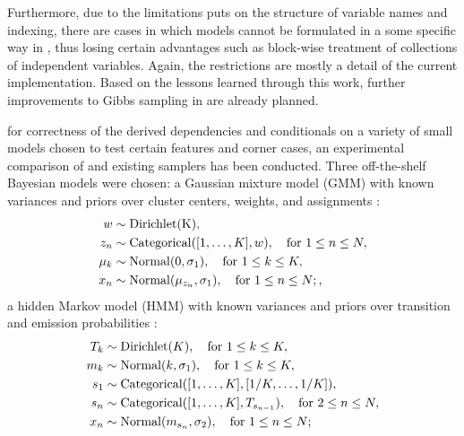 Furthermore, due to the limitations \autogibbsjl{} puts on the structure of variable names and
indexing, there are cases in which models cannot be formulated in a some specific way in \dppljl{},
thus losing certain advantages such as block-wise treatment of collections of independent variables.
Again, the restrictions are mostly a detail of the current implementation.  Based on the lessons
learned through this work, further improvements to Gibbs sampling in \turingjl{} are already
planned.

 for correctness of the derived dependencies and conditionals
on a variety of small models chosen to test certain features and corner cases, an experimental
comparison of \autogibbsjl{} and existing \turingjl{} samplers has been conducted.  Three
off-the-shelf Bayesian models were chosen: a Gaussian mixture model (GMM) with known variances and
priors over cluster centers, weights, and assignments \parencite[section 6.2]{marin2007bayesian}:
\begin{equation}
  \label{eq:gmm}
  \begin{aligned}
    w &\sim \mathrm{Dirichlet(K)}, \\
    z_{n} &\sim \mathrm{Categorical}([1, \ldots, K], w), \quad\text{for } 1 \le n \le N, \\
    \mu_{k} &\sim \mathrm{Normal}(0, \sigma_{1}), \quad\text{for } 1 \le k \le K, \\
    x_{n} &\sim \mathrm{Normal}(\mu_{z_{n}}, \sigma_{1}), \quad\text{for } 1 \le n \le N;,
  \end{aligned}
\end{equation}
a hidden Markov model
(HMM) with known variances and priors over transition and emission probabilities \parencite[section
7.3]{marin2007bayesian}:
\begin{equation}
  \label{eq:hmm}
  \begin{aligned}
    T_{k} &\sim \mathrm{Dirichlet}(K), \quad\text{for } 1 \le k \le K, \\
    m_{k} &\sim \mathrm{Normal}(k, \sigma_{1}), \quad\text{for } 1 \le k \le K, \\
    s_{1} &\sim \mathrm{Categorical}([1, \ldots, K], [1/K, \ldots, 1/K]), \\
    s_{n} &\sim \mathrm{Categorical}([1, \ldots, K], T_{s_{n-1}}), \quad\text{for } 2 \le n \le N, \\
    x_{n} &\sim \mathrm{Normal}(m_{s_{n}}, \sigma_{2}), \quad\text{for } 1 \le n \le N;
  \end{aligned}
\end{equation}
